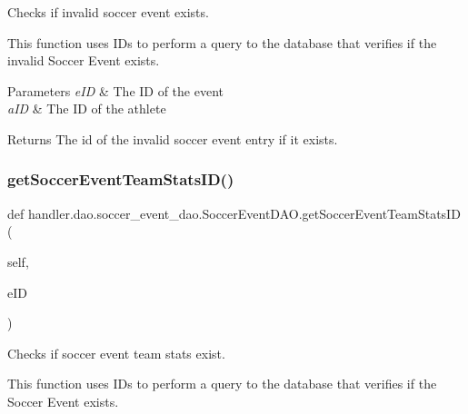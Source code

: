 Checks if invalid soccer event exists. 

This function uses I\+Ds to perform a query to the database that verifies if the invalid Soccer Event exists.


\begin{DoxyParams}{Parameters}
{\em e\+ID} & The ID of the event \\
\hline
{\em a\+ID} & The ID of the athlete\\
\hline
\end{DoxyParams}
\begin{DoxyReturn}{Returns}
The id of the invalid soccer event entry if it exists. 
\end{DoxyReturn}
\mbox{\label{classhandler_1_1dao_1_1soccer__event__dao_1_1_soccer_event_d_a_o_a9ea8014593e4b0dd7c8e0d815ee9a45f}} 
\subsubsection{\texorpdfstring{get\+Soccer\+Event\+Team\+Stats\+I\+D()}{getSoccerEventTeamStatsID()}}
{\footnotesize\ttfamily def handler.\+dao.\+soccer\+\_\+event\+\_\+dao.\+Soccer\+Event\+D\+A\+O.\+get\+Soccer\+Event\+Team\+Stats\+ID (\begin{DoxyParamCaption}\item[{}]{self,  }\item[{}]{e\+ID }\end{DoxyParamCaption})}



Checks if soccer event team stats exist. 

This function uses I\+Ds to perform a query to the database that verifies if the Soccer Event exists.


